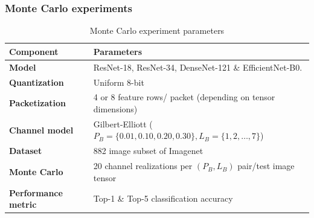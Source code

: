 \documentclass[aspectratio=169]{beamer}
\begin{document}
\begin{frame}
\frametitle{Monte Carlo experiments}
    \begin{table}[t]   \caption{Monte Carlo experiment parameters}
  \label{tab:description:mc}
  \centering
 \begin{tabular}{ l | l }
   \textbf{Component} & \textbf{Parameters} \\
      \hline
      \hline
      \textbf{Model} & ResNet-18, ResNet-34, DenseNet-121 \& EfficientNet-B0. \\
      \hline  
      \textbf{Quantization} & Uniform 8-bit \\
      \hline
      \textbf{Packetization} & 4 or 8 feature rows/ packet (depending on tensor dimensions) \\
      \hline
      \textbf{Channel model} & Gilbert-Elliott ($P_B = \{0.01,0.10,0.20,0.30\},L_B=\{1,2,\dotsc,7\}$)\\
      \hline
      \textbf{Dataset} & 882 image subset of Imagenet \\
      \hline
      \textbf{Monte Carlo} & 20 channel realizations per $(P_B,L_B)$ pair/test image tensor \\
      \hline
      \textbf{Performance metric} & Top-1 \& Top-5 classification accuracy
    \end{tabular}
\end{table}

\end{frame}
\end{document}
